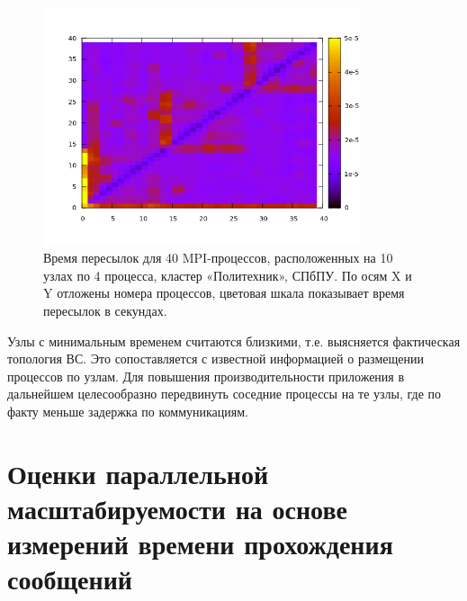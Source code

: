 		
		\begin{figure}[htb]
			\begin{center}
				\includegraphics[height=7cm,keepaspectratio]{images/polytech_all_to_all.png}
			\end{center}
			\caption{Время пересылок для 40 MPI-процессов, расположенных на 10 узлах по 4 процесса, кластер «Политехник», СПбПУ. По осям X и Y отложены номера процессов, цветовая шкала показывает время пересылок в секундах.}
			\label{poly_all2all}
		\end{figure} 
		Узлы с минимальным временем считаются близкими, т.е. выясняется фактическая топология ВС. Это сопоставляется с известной информацией о размещении процессов по узлам.	Для повышения производительности приложения в дальнейшем целесообразно передвинуть соседние процессы на те узлы, где по факту меньше задержка по коммуникациям.
		
		
        \section{Оценки параллельной масштабируемости на основе измерений времени прохождения сообщений}
        
